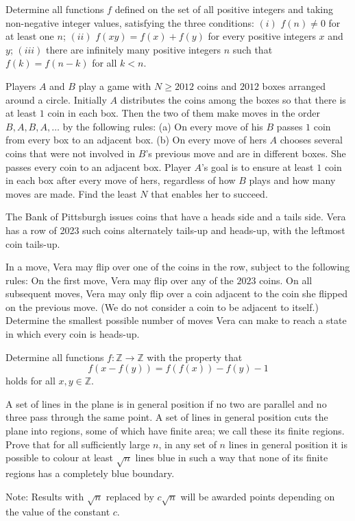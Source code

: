 \documentclass[11pt]{scrartcl}
\begin{document}
\begin{problem}[6116877365036470315]
	Determine all functions $f$ defined on the set of all positive integers and taking non-negative integer values, satisfying the three conditions:
$(i)$ $f(n) \neq 0$ for at least one $n$;
$(ii)$ $f(x y)=f(x)+f(y)$ for every positive integers $x$ and $y$;
$(iii)$ there are infinitely many positive integers $n$ such that $f(k)=f(n-k)$ for all $k<n$.
\end{problem}
\begin{problem}[857047923056144]
Players $A$ and $B$ play a game with $N \geq 2012$ coins and $2012$ boxes arranged around a circle. Initially $A$ distributes the coins among the boxes so that there is at least $1$ coin in each box. Then the two of them make moves in the order $B,A,B,A,\ldots $ by the following rules:
(a) On every move of his $B$ passes $1$ coin from every box to an adjacent box.
(b) On every move of hers $A$ chooses several coins that were not involved in $B$'s previous move and are in different boxes. She passes every coin to an adjacent box.
Player $A$'s goal is to ensure at least $1$ coin in each box after every move of hers, regardless of how $B$ plays and how many moves are made. Find the least $N$ that enables her to succeed.
\end{problem}
\begin{problem}[899785005954032]
The Bank of Pittsburgh issues coins that have a heads side and a tails side. Vera has a row of 2023 such coins alternately tails-up and heads-up, with the leftmost coin tails-up.

In a move, Vera may flip over one of the coins in the row, subject to the following rules:
On the first move, Vera may flip over any of the $2023$ coins.
On all subsequent moves, Vera may only flip over a coin adjacent to the coin she flipped on the previous move. (We do not consider a coin to be adjacent to itself.)
Determine the smallest possible number of moves Vera can make to reach a state in which every coin is heads-up.
\end{problem}
\begin{problem}[119687225328684]
Determine all functions $f:\mathbb{Z}\rightarrow\mathbb{Z}$ with the property that\[f(x-f(y))=f(f(x))-f(y)-1\]holds for all $x,y\in\mathbb{Z}$.
\end{problem}
\begin{problem}[116786407849814]
A set of lines in the plane is in general position if no two are parallel and no three pass through the same point. A set of lines in general position cuts the plane into regions, some of which have finite area; we call these its finite regions. Prove that for all sufficiently large $n$, in any set of $n$ lines in general position it is possible to colour at least $\sqrt{n}$ lines blue in such a way that none of its finite regions has a completely blue boundary.

Note: Results with $\sqrt{n}$ replaced by $c\sqrt{n}$ will be awarded points depending on the value of the constant $c$.
\end{problem}
\end{document}
